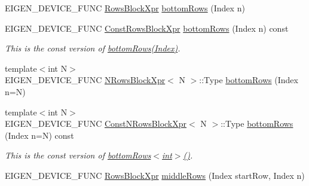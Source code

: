 \begin{DoxyCompactItemize}
E\+I\+G\+E\+N\+\_\+\+D\+E\+V\+I\+C\+E\+\_\+\+F\+U\+NC \mbox{\hyperlink{class_eigen_1_1_block}{Rows\+Block\+Xpr}} \mbox{\hyperlink{class_eigen_1_1_dense_base_acff625e5f44ffe92bf79d20223114c2d}{bottom\+Rows}} (Index n)
\item 
\mbox{\label{class_eigen_1_1_dense_base_a879183ab1acb80698e6a34f534b3c3ac}} 
E\+I\+G\+E\+N\+\_\+\+D\+E\+V\+I\+C\+E\+\_\+\+F\+U\+NC \mbox{\hyperlink{class_eigen_1_1_block}{Const\+Rows\+Block\+Xpr}} \mbox{\hyperlink{class_eigen_1_1_dense_base_a879183ab1acb80698e6a34f534b3c3ac}{bottom\+Rows}} (Index n) const
\begin{DoxyCompactList}\small\item\em This is the const version of \mbox{\hyperlink{class_eigen_1_1_dense_base_acff625e5f44ffe92bf79d20223114c2d}{bottom\+Rows(\+Index)}}. \end{DoxyCompactList}\item 
{\footnotesize template$<$int N$>$ }\\E\+I\+G\+E\+N\+\_\+\+D\+E\+V\+I\+C\+E\+\_\+\+F\+U\+NC \mbox{\hyperlink{struct_eigen_1_1_dense_base_1_1_n_rows_block_xpr}{N\+Rows\+Block\+Xpr}}$<$ N $>$\+::Type \mbox{\hyperlink{class_eigen_1_1_dense_base_a7c9783f4e62212b5b6eb6569f282e95c}{bottom\+Rows}} (Index n=N)
\item 
\mbox{\label{class_eigen_1_1_dense_base_ae4efe1d66eb46763d997910f60cc00ba}} 
{\footnotesize template$<$int N$>$ }\\E\+I\+G\+E\+N\+\_\+\+D\+E\+V\+I\+C\+E\+\_\+\+F\+U\+NC \mbox{\hyperlink{struct_eigen_1_1_dense_base_1_1_const_n_rows_block_xpr}{Const\+N\+Rows\+Block\+Xpr}}$<$ N $>$\+::Type \mbox{\hyperlink{class_eigen_1_1_dense_base_ae4efe1d66eb46763d997910f60cc00ba}{bottom\+Rows}} (Index n=N) const
\begin{DoxyCompactList}\small\item\em This is the const version of \mbox{\hyperlink{class_eigen_1_1_dense_base_acff625e5f44ffe92bf79d20223114c2d}{bottom\+Rows$<$int$>$()}}. \end{DoxyCompactList}\item 
E\+I\+G\+E\+N\+\_\+\+D\+E\+V\+I\+C\+E\+\_\+\+F\+U\+NC \mbox{\hyperlink{class_eigen_1_1_block}{Rows\+Block\+Xpr}} \mbox{\hyperlink{class_eigen_1_1_dense_base_a604b8a3100dd565b536720c2df24e10f}{middle\+Rows}} (Index start\+Row, Index n)
\item 
\mbox{\label{class_eigen_1_1_dense_base_a21b239da40faaef9658b4632d7dd77a7}} 

\end{DoxyCompactItemize}
